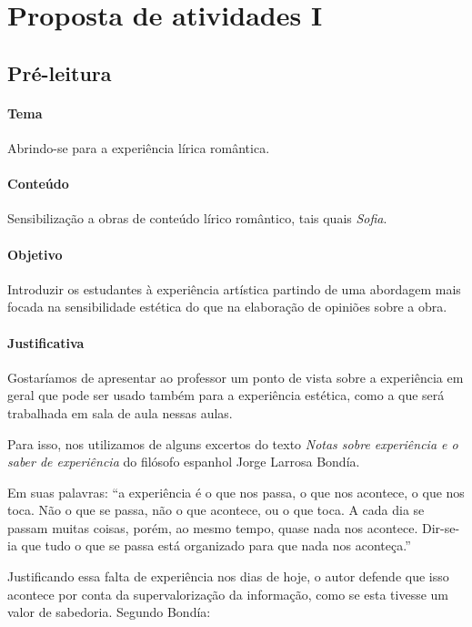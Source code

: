 \documentclass[12pt]{extarticle}
\begin{document}
\pagebreak\section{Proposta de atividades I}

\subsection{Pré-leitura}


\paragraph{Tema} Abrindo-se para a experiência lírica romântica.

\paragraph{Conteúdo} Sensibilização a obras de conteúdo lírico romântico,
tais quais \emph{Sofia}.

\paragraph{Objetivo} Introduzir os estudantes à experiência artística
partindo de uma abordagem mais focada na sensibilidade estética do que
na elaboração de opiniões sobre a obra. 

\paragraph{Justificativa} Gostaríamos de apresentar ao professor um
ponto de vista sobre a experiência em geral que pode ser usado
também para a experiência estética, como a que será trabalhada em 
sala de aula nessas aulas. 

Para isso, nos utilizamos de alguns excertos do texto \emph{Notas sobre
experiência e o saber de experiência} do filósofo espanhol Jorge
Larrosa Bondía. 

Em suas palavras: ``a experiência é o que nos passa, 
o que nos acontece, o que nos toca. Não o que se passa, não o que acontece, ou o que toca. A cada dia se 
passam muitas coisas, porém, ao mesmo tempo, quase nada nos acontece. 
Dir-se-ia que tudo o que se passa está organizado para que nada nos aconteça.''

Justificando essa falta de experiência nos dias de hoje, 
o autor defende que isso acontece por conta da supervalorização
da informação, como se esta tivesse um valor de sabedoria. Segundo Bondía: 
\end{document}
